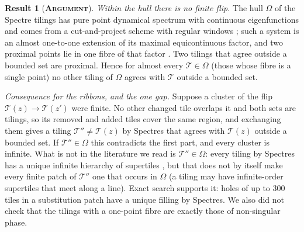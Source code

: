 \documentclass[11pt]{article}
\newcommand{\argu}{\textbf{\textsc{Argument}}}
\theoremstyle{definition}
\newtheorem{result}{Result}
\begin{document}
\begin{result}[\argu]\label{res:infinite}
\emph{Within the hull there is no finite flip.} The hull $\Omega$ of the Spectre tilings has pure point dynamical spectrum with continuous eigenfunctions and comes from a cut-and-project scheme with regular windows \cite{bgms}; such a system is an almost one-to-one extension of its maximal equicontinuous factor, and two proximal points lie in one fibre of that factor \cite{aujogue2014}. Two tilings that agree outside a bounded set are proximal. Hence for almost every $\mathcal{T}\in\Omega$ (those whose fibre is a single point) no other tiling of $\Omega$ agrees with $\mathcal{T}$ outside a bounded set.

\emph{Consequence for the ribbons, and the one gap.} Suppose a cluster of the flip $\mathcal{T}(z)\to\mathcal{T}(z')$ were finite. No other changed tile overlaps it and both sets are tilings, so its removed and added tiles cover the same region, and exchanging them gives a tiling $\mathcal{T}''\neq\mathcal{T}(z)$ by Spectres that agrees with $\mathcal{T}(z)$ outside a bounded set. If $\mathcal{T}''\in\Omega$ this contradicts the first part, and every cluster is infinite. What is not in the literature we read is $\mathcal{T}''\in\Omega$: every tiling by Spectres has a unique infinite hierarchy of supertiles \cite{smith2023}, but that does not by itself make every finite patch of $\mathcal{T}''$ one that occurs in $\Omega$ (a tiling may have infinite-order supertiles that meet along a line). Exact search supports it: holes of up to $300$ tiles in a substitution patch have a unique filling by Spectres. We also did not check that the tilings with a one-point fibre are exactly those of non-singular phase.


\end{result}
\end{document}
